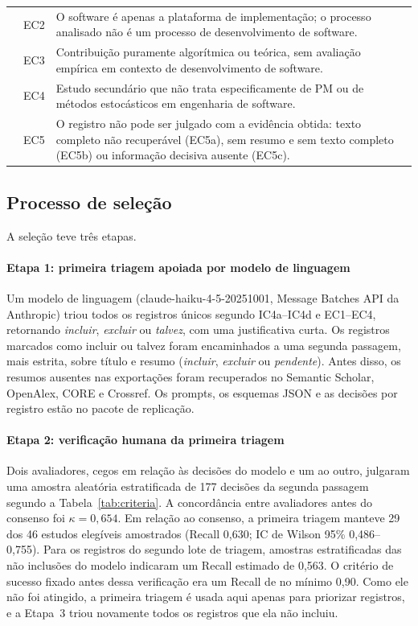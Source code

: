 \documentclass[preprint,12pt,authoryear=false]{elsarticle}
\begin{document}
\begin{table}[t]
\begin{tabularx}{\textwidth}{llX}
 & EC2 & O software é apenas a plataforma de implementação; o processo analisado não é um processo de desenvolvimento de software. \\
 & EC3 & Contribuição puramente algorítmica ou teórica, sem avaliação empírica em contexto de desenvolvimento de software. \\
 & EC4 & Estudo secundário que não trata especificamente de PM ou de métodos estocásticos em engenharia de software. \\
 & EC5 & O registro não pode ser julgado com a evidência obtida: texto completo não recuperável (EC5a), sem resumo e sem texto completo (EC5b) ou informação decisiva ausente (EC5c). \\
\bottomrule
\end{tabularx}
\end{table}

\subsection{Processo de seleção}\label{sec:selection-process}

A seleção teve três etapas.

\paragraph{Etapa 1: primeira triagem apoiada por modelo de linguagem}
Um modelo de linguagem (claude-haiku-4-5-20251001, Message Batches API da Anthropic) triou todos os registros únicos segundo IC4a--IC4d e EC1--EC4, retornando \emph{incluir}, \emph{excluir} ou \emph{talvez}, com uma justificativa curta. Os registros marcados como incluir ou talvez foram encaminhados a uma segunda passagem, mais estrita, sobre título e resumo (\emph{incluir}, \emph{excluir} ou \emph{pendente}). Antes disso, os resumos ausentes nas exportações foram recuperados no Semantic Scholar, OpenAlex, CORE e Crossref. Os prompts, os esquemas JSON e as decisões por registro estão no pacote de replicação.

\paragraph{Etapa 2: verificação humana da primeira triagem}
Dois avaliadores, cegos em relação às decisões do modelo e um ao outro, julgaram uma amostra aleatória estratificada de 177 decisões da segunda passagem segundo a Tabela~\ref{tab:criteria}. A concordância entre avaliadores antes do consenso foi $\kappa = 0{,}654$. Em relação ao consenso, a primeira triagem manteve 29 dos 46 estudos elegíveis amostrados (Recall 0,630; IC de Wilson 95\% 0,486--0,755). Para os registros do segundo lote de triagem, amostras estratificadas das não inclusões do modelo indicaram um Recall estimado de 0,563. O critério de sucesso fixado antes dessa verificação era um Recall de no mínimo 0,90. Como ele não foi atingido, a primeira triagem é usada aqui apenas para priorizar registros, e a Etapa~3 triou novamente todos os registros que ela não incluiu.
\end{document}
